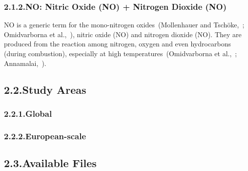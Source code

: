 \documentclass[9pt]{report}
\begin{document}
\subsubsection{2.1.2.\hspace*{0.5em}NO: Nitric Oxide (NO) + Nitrogen Dioxide (NO)}\label{sec-nox--nitric-oxide-no-nitrogen-dioxide-no2}%

\noindent{}NO is a generic term for the mono-nitrogen oxides~(Mollenhauer and Tschöke,~; Omidvarborna et al.,~), nitric oxide (NO) and nitrogen dioxide (NO).
They are produced from the reaction among nitrogen, oxygen and even hydrocarbons (during combustion), especially at high temperatures~(Omidvarborna et al.,~; Annamalai,~).%

\subsection{2.2.\hspace*{0.5em}Study Areas}\label{sec-study-areas}%

\subsubsection{2.2.1.\hspace*{0.5em}Global}\label{sec-global}%

\subsubsection{2.2.2.\hspace*{0.5em}European-scale}\label{sec-european-scale}%

\subsection{2.3.\hspace*{0.5em}Available Files}\label{sec-available-files}%
\end{document}
